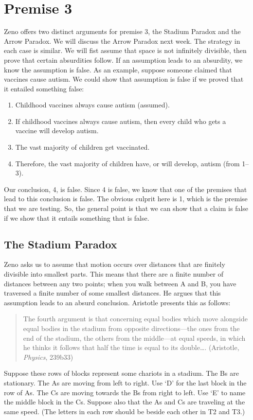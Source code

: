 \documentclass[oneside]{article}
\begin{document}
\section*{Premise 3}\label{premise-3}

Zeno offers two distinct arguments for premise 3, the Stadium Paradox and the Arrow Paradox. We will discuss the Arrow Paradox next week.  The strategy in each case is similar. We will fist assume that space is not infinitely divisible, then prove that certain absurdities follow. If an assumption leads to an absurdity, we know the assumption is false. As an example, suppose someone claimed that vaccines cause autism. We could show that assumption is false if we proved that it entailed something false: 

\begin{enumerate}
\item  Childhood vaccines always cause autism (assumed). 
\item If childhood vaccines always cause autism, then every child who gets a vaccine will develop autism. 
\item The vast majority of children get vaccinated. 
\item Therefore, the vast majority of children have, or will develop, autism (from 1--3). 
\end{enumerate}
Our conclusion, 4, is false. Since 4 is false, we know that one of the premises that lead to this conclusion is false. The obvious culprit here is 1, which is the premise that we are testing. So, the general point is that we can show that a claim is false if we show that it entails something that is  false. 


\subsection*{The Stadium Paradox}\label{stadium-paradox}

Zeno asks us to assume that motion occurs over distances that are finitely divisible into smallest parts. This means that there are a finite number of distances between any two points; when you walk between A and B, you have traversed a finite number of some smallest distances. He argues that this assumption leads to an absurd conclusion. Aristotle presents this as follows: 



\begin{quote}
The fourth argument is that concerning equal bodies which move alongside equal bodies in the stadium from opposite directions---the ones from the end of the stadium, the others from the middle---at equal speeds, in which he thinks it follows that half the time is equal to its
double\ldots{}. (Aristotle, \emph{Physics}, 239b33)
\end{quote}
Suppose these rows of blocks represent some chariots in a stadium. The
Bs are stationary. The As are moving from left to right. Use `D' for the last block in the row of As. The Cs are moving towards the Bs from right to left. Use `E' to name the middle block in the Cs. Suppose also that the As and Cs are traveling at the same speed. (The letters in each row should be beside each other in T2 and T3.)
\end{document}
